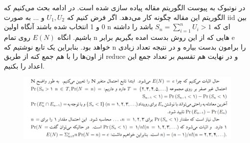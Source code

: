 \begin{prob}
\end{prob}
\begin{sol}

در نوتبوک به پیوست الگوریتم مقاله پیاده سازی شده است. در ادامه بحث می‌کنیم که الگوریتم این مقاله چگونه کار می‌دهد. 
اگر فرض کنیم که $U_{1}, U_{2}$ و ... به صورت iid بین 0 و 1 انتخاب شده باشند آنگاه اولین n ای که 
 $S_{n}=\sum_{i=1}^{n} U_{i} > 1 $
باشد را داشته باشیم.
انگاه $E(N)$ روی تمام n هایی که از این روش بدست امده بگیریم برابر e خواهد بود.
بنابراین یک تابع نوشتیم که n را برامون بدست بیاره و در نتیجه تعداد زیادی از اون‌ها را با هم جمع کنه از طریق reduce و در نهایت هم تقسیم بر تعداد جمع این اعداد را بکنیم.

\begin{figure}[h]
\centering
\includegraphics[scale=0.9]{555.PNG}
\end{figure}

\end{sol}

\begin{prob}
\end{prob}

